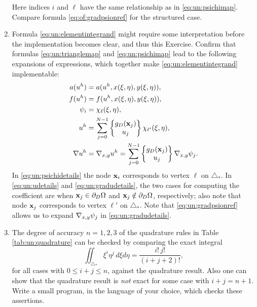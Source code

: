 \begin{enumerate}
\begin{equation}
\end{equation}
Here indices $i$ and $\ell$ have the same relationship as in \eqref{eq:un:psichimap}.  Compare formula \eqref{eq:of:gradpsionref} for the structured case.
\item  \label{exer:un:elementintegranddetails}  Formula \eqref{eq:un:elementintegrand} might require some interpretation before the implementation becomes clear, and thus this Exercise.  Confirm that formulas \eqref{eq:un:trianglemap} and \eqref{eq:un:psichimap} lead to the following expansions of expressions, which together make \eqref{eq:un:elementintegrand} implementable:
\begin{align}
a(u^h) &= a(u^h,x(\xi,\eta),y(\xi,\eta)), \label{eq:un:adetails} \\
f(u^h) &= f(u^h,x(\xi,\eta),y(\xi,\eta)), \label{eq:un:fdetails} \\
\psi_i &= \chi_{\ell}(\xi,\eta), \label{eq:un:psichidetails} \\
u^h &= \sum_{j=0}^{N-1} \left\{\begin{matrix} g_D(\mathbf{x}_j) \\ u_j \end{matrix}\right\} \chi_{\ell'}(\xi,\eta), \label{eq:un:udetails} \\
\nabla u^h &= \nabla_{x,y} u^h = \sum_{j=0}^{N-1} \left\{\begin{matrix} g_D(\mathbf{x}_j) \\ u_j \end{matrix}\right\} \nabla_{x,y} \psi_j. \label{eq:un:gradudetails}
\end{align}
In \eqref{eq:un:psichidetails} the node $\mathbf{x}_i$ corresponds to vertex $\ell$ on $\triangle_\ast$.  In \eqref{eq:un:udetails} and \eqref{eq:un:gradudetails}, the two cases for computing the coefficient are when $\mathbf{x}_j \in \partial_D \Omega$ and $\mathbf{x}_j \notin \partial_D \Omega$, respectively; also note that node $\mathbf{x}_j$ corresponds to vertex $\ell'$ on $\triangle_\ast$.  Note that \eqref{eq:un:gradpsionref} allows us to expand $\nabla_{x,y} \psi_j$ in \eqref{eq:un:gradudetails}.
\item  \label{exer:un:checkquadrature}  The degree of accuracy $n=1,2,3$ of the quadrature rules in Table \ref{tab:un:quadrature} can be checked by comparing the exact integral
\begin{equation}
\iint_{\triangle_\ast} \xi^i \eta^j\,d\xi d\eta = \frac{i!\,j!}{(i+j+2)!}, \label{eq:un:checkquadrature}
\end{equation}
for all cases with $0\le i+j\le n$, against the quadrature result.  Also one can show that the quadrature result is \emph{not} exact for some case with $i+j=n+1$.  Write a small program, in the language of your choice, which checks these assertions.

\end{enumerate}

